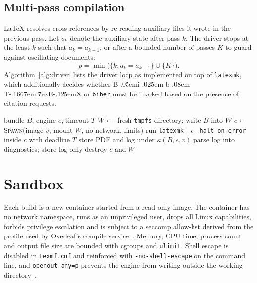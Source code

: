 \documentclass[journal]{IEEEtran}
\def\BibTeX{{\rm B\kern-.05em{\sc i\kern-.025em b}\kern-.08em
    T\kern-.1667em\lower.7ex\hbox{E}\kern-.125emX}}
\begin{document}
\subsection{Multi-pass compilation}
\LaTeX{} resolves cross-references by re-reading auxiliary files it wrote in
the previous pass. Let $a_k$ denote the auxiliary state after pass $k$. The
driver stops at the least $k$ such that $a_k = a_{k-1}$, or after a bounded
number of passes $K$ to guard against oscillating documents:
\begin{equation}
  p = \min\big(\{k : a_k = a_{k-1}\} \cup \{K\}\big).
\end{equation}
Algorithm~\ref{alg:driver} lists the driver loop as implemented on top of
\texttt{latexmk}, which additionally decides whether \BibTeX{} or
\texttt{biber} must be invoked based on the presence of citation requests.

\begin{algorithm}[!t]
  \caption{Sandboxed build driver}
  \label{alg:driver}
  \begin{algorithmic}[1]
    \REQUIRE bundle $B$, engine $e$, timeout $T$
    \STATE $W \leftarrow$ fresh \texttt{tmpfs} directory; write $B$ into $W$
    \STATE $c \leftarrow$ \textsc{Spawn}(image $v$, mount $W$, no network, limits)
    \STATE run \texttt{latexmk -}$e$ \texttt{-halt-on-error} inside $c$ with deadline $T$
      \STATE store PDF and log under $\kappa(B, e, v)$
    \ELSE
      \STATE parse log into diagnostics; store log only
    \ENDIF
    \STATE destroy $c$ and $W$
  \end{algorithmic}
\end{algorithm}

\section{Sandbox}
\label{sec:sandbox}
Each build is a new container started from a read-only image. The container
has no network namespace, runs as an unprivileged user, drops all Linux
capabilities, forbids privilege escalation and is subject to a seccomp
allow-list derived from the profile used by Overleaf's compile
service~\cite{overleaf2023}. Memory, CPU time, process count and output file
size are bounded with cgroups and \texttt{ulimit}. Shell escape is disabled
in \texttt{texmf.cnf} and reinforced with \texttt{-no-shell-escape} on the
command line, and \texttt{openout\_any=p} prevents the engine from writing
outside the working directory~\cite{nist2017container}.
\end{document}
